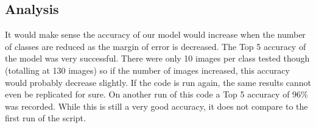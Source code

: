 \subsection*{Analysis}
It would make sense the accuracy of our model would increase when the number of classes are reduced as the margin of error is decreased.
The Top 5 accuracy of the model was very successful.
There were only 10 images per class tested though (totalling at 130 images) so if the number of images increased, this accuracy would probably decrease slightly.
If the code is run again, the same results cannot even be replicated for sure.
On another run of this code a Top 5 accuracy of 96\% was recorded.
While this is still a very good accuracy, it does not compare to the first run of the script.